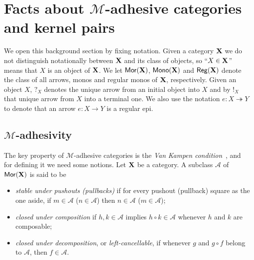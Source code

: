 \documentclass[3p]{elsarticle}
\def\X{\textbf {\textup{X}}}
\newcommand{\mor}{\mathsf{Mor}}
\newcommand{\mon}{\mathsf{Mono}}
\newcommand{\reg}{\mathsf{Reg}}
\newcommand{\eto}{\twoheadrightarrow}
\theoremstyle{remark}
\theoremstyle{definition}
\begin{document}
\section{Facts about $\mathcal{M}$-adhesive categories and kernel pairs}\label{sec:ade}

We open this background section by fixing notation. Given a category $\X$ we do not distinguish notationally between $\X$ and its class of objects, so
``$X\in \X$'' means that $X$ is an object of $\X$. We let $\mor(\X)$, $\mon(\X)$ and $\reg(\X)$ denote the class of all arrows, monos and regular monos of $\X$, respectively.  Given an object $X$, $?_X$ denotes the unique arrow from an initial object into $X$ and by $!_X$ that  unique arrow from $X$ into a terminal one. We also use the notation $e\colon X\eto Y$ to denote that an arrow $e\colon X\to Y$ is a regular epi. 

\subsection{$\mathcal{M}$-adhesivity}\label{subsec:ade}
The key property of $\mathcal{M}$-adhesive categories is the \emph{Van Kampen condition}~\cite{brown1997van,johnstone2007quasitoposes,lack2005adhesive},
%
and for defining it we need some notions.
Let  $\X$ be a category. A subclass $\mathcal{A}$ of $\mor(\X)$ is said to be

\smallskip 
\noindent
\begin{minipage}[l]{.85\linewidth}
\begin{itemize}
	\item		\emph{stable under pushouts (pullbacks)} if for every pushout (pullback) square as the one aside, if $m \in \mathcal{A}$ ($n\in \mathcal{A}$) then $n \in \mathcal{A}$ ($m \in \mathcal{A}$);
	\item \emph{closed under composition} if $h, k\in \mathcal{A}$ implies $h\circ k\in \mathcal{A}$ whenever $h$ and $k$ are composable;
	\item \emph{closed under decomposition}, or \emph{left-cancellable}, if whenever $g$ and $g\circ f$ belong to $\mathcal{A}$, then $f\in \mathcal{A}$.
	\end{itemize}
\end{minipage}\hfill 
\begin{minipage}[r]{.13\linewidth}
\end{minipage}
\end{document}
